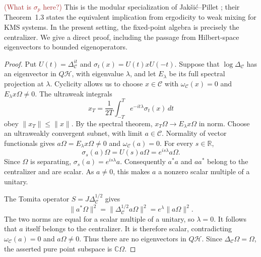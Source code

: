 \documentclass[a4paper,11pt]{article}
\theoremstyle{definition}
\newcommand{\KL}[1]{\textcolor{brown}{#1}}
\begin{document}
\KL{(What is $\sigma_p$ here?)} This is the modular specialization of Jak\v{s}i\'c--Pillet \cite[Theorem~1.2]{JaksicPillet2001Liouvilleans}; their Theorem~1.3 states the equivalent implication from ergodicity to weak mixing for KMS systems. In the present setting, the fixed-point algebra is precisely the centralizer. We give a direct proof, including the passage from Hilbert-space eigenvectors to bounded eigenoperators.

\begin{proof}
Put $U(t)=\Delta_{\mathcal C}^{it}$ and $\sigma_t(x)=U(t)xU(-t)$. Suppose that $\log\Delta_{\mathcal C}$ has an eigenvector in $Q\mathcal H$, with eigenvalue $\lambda$, and let $E_\lambda$ be its full spectral projection at $\lambda$. Cyclicity allows us to choose $x\in\mathcal C$ with $\omega_{\mathcal C}(x)=0$ and $E_\lambda x\Omega\ne0$. The ultraweak integrals
\begin{equation}
 x_T=\frac1{2T}\int_{-T}^{T}e^{-it\lambda}\sigma_t(x)\,dt
 \label{eq:appC-eigenoperator-averages}
\end{equation}
obey $\|x_T\|\le\|x\|$. By the spectral theorem,
$x_T\Omega\to E_\lambda x\Omega$ in norm. Choose an ultraweakly convergent subnet, with limit $a\in\mathcal C$. Normality of vector functionals gives
$a\Omega=E_\lambda x\Omega\ne0$ and $\omega_{\mathcal C}(a)=0$.
For every $s\in\mathbb R$,
\[
 \sigma_s(a)\Omega=U(s)a\Omega=e^{is\lambda}a\Omega .
\]
Since $\Omega$ is separating, $\sigma_s(a)=e^{is\lambda}a$. Consequently $a^*a$ and $aa^*$ belong to the centralizer and are scalar. As $a\ne0$, this makes $a$ a nonzero scalar multiple of a unitary.

The Tomita operator $S=J\Delta_{\mathcal C}^{1/2}$ gives
\begin{equation}
 \|a^*\Omega\|^2=\|\Delta_{\mathcal C}^{1/2}a\Omega\|^2
 =e^\lambda\|a\Omega\|^2 .
 \label{eq:appC-eigenoperator-balance}
\end{equation}
The two norms are equal for a scalar multiple of a unitary, so $\lambda=0$. It follows that $a$ itself belongs to the centralizer. It is therefore scalar, contradicting $\omega_{\mathcal C}(a)=0$ and $a\Omega\ne0$. Thus there are no eigenvectors in $Q\mathcal H$. Since $\Delta_{\mathcal C}\Omega=\Omega$, the asserted pure point subspace is $\mathbb C\Omega$.
\end{proof}
\end{document}
